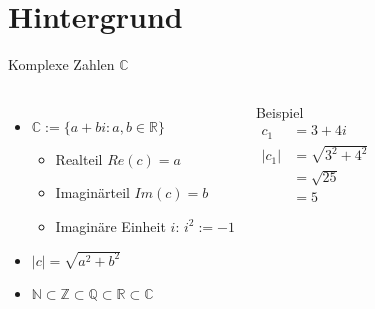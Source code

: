 \EnableTitleSlide
\section{Hintergrund}
\begin{frame}{Komplexe Zahlen $\mathbb{C}$}    
    \begin{columns}[c]
            \begin{itemize}
                \item $\mathbb{C} := \{a+ bi: a, b \in \mathbb{R}\}$
                \begin{itemize}
                    \item Realteil $Re(c)=a$
                    \item Imaginärteil $Im(c)=b$
                    \item Imaginäre Einheit $i$: $i^2 := -1$
                \end{itemize}
                \item $|c| = \sqrt{a^2+b^2}$
                \item $\mathbb{N} \subset \mathbb{Z} \subset \mathbb{Q} \subset \mathbb{R} \subset \mathbb{C}$
            \end{itemize}
            \begin{exampleblock}{Beispiel}
                \vspace{-0.45cm}
                \begin{align*}
                    c_1&=3 + 4i \\[0.2cm]
                    |c_1|&=\sqrt{3^2+4^2}\\ 
                    &=\sqrt{25} \\
                    &=5
                \end{align*}
            \end{exampleblock}
    \end{columns}
\end{frame}

